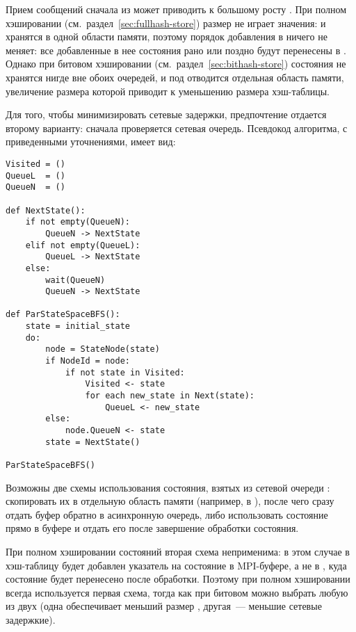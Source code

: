 Прием сообщений сначала из  может приводить к большому росту
. При полном хэшировании (см.~раздел~\ref{sec:fullhash-store}) размер
 не играет значения:  и  хранятся в одной
области памяти, поэтому порядок добавления в  ничего не меняет: все
добавленные в нее состояния рано или поздно будут перенесены в . Однако при
битовом хэшировании (см.~раздел~\ref{sec:bithash-store}) состояния не хранятся нигде вне
обоих очередей, и под  отводится отдельная область памяти, увеличение
размера которой приводит к уменьшению размера хэш-таблицы.

Для того, чтобы минимизировать сетевые задержки, предпочтение отдается второму варианту:
сначала проверяется сетевая очередь. Псевдокод алгоритма, с приведенными уточнениями,
имеет вид:

\begin{lstlisting}[style=pseudocode]
Visited = ()
QueueL  = ()
QueueN  = ()

def NextState():
    if not empty(QueueN):
        QueueN -> NextState
    elif not empty(QueueL):
        QueueL -> NextState
    else:
        wait(QueueN)
        QueueN -> NextState

def ParStateSpaceBFS():
    state = initial_state
    do:
        node = StateNode(state)
        if NodeId = node:
            if not state in Visited:
                Visited <- state
                for each new_state in Next(state):
                    QueueL <- new_state
        else:
            node.QueueN <- state
        state = NextState()

ParStateSpaceBFS()
\end{lstlisting}

Возможны две схемы использования состояния, взятых из сетевой очереди :
скопировать их в отдельную область памяти (например, в ), после чего сразу
отдать буфер обратно в асинхронную очередь, либо использовать состояние прямо в буфере и
отдать его после завершение обработки состояния. 

При полном хэшировании состояний вторая схема неприменима: в этом случае в хэш-таблицу
будет добавлен указатель на состояние в MPI-буфере, а не в , куда состояние
будет перенесено после обработки. Поэтому при полном хэшировании всегда используется
первая схема, тогда как при битовом можно выбрать любую из двух (одна обеспечивает меньший
размер , другая~--- меньшие сетевые задержкие).

